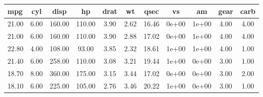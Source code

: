 \begin{tabular}{lcccccccccc}
\hline
\textbf{mpg} & \textbf{cyl} & \textbf{disp} & \textbf{hp} & \textbf{drat} & \textbf{wt} & \textbf{qsec} & \textbf{vs} & \textbf{am} & \textbf{gear} & \textbf{carb} \\
\hline
21.00 & 6.00 & 160.00 & 110.00 & 3.90 & 2.62 & 16.46 & 0e+00 & 1e+00 & 4.00 & 4.00\\
21.00 & 6.00 & 160.00 & 110.00 & 3.90 & 2.88 & 17.02 & 0e+00 & 1e+00 & 4.00 & 4.00\\
22.80 & 4.00 & 108.00 &  93.00 & 3.85 & 2.32 & 18.61 & 1e+00 & 1e+00 & 4.00 & 1.00\\
21.40 & 6.00 & 258.00 & 110.00 & 3.08 & 3.21 & 19.44 & 1e+00 & 0e+00 & 3.00 & 1.00\\
18.70 & 8.00 & 360.00 & 175.00 & 3.15 & 3.44 & 17.02 & 0e+00 & 0e+00 & 3.00 & 2.00\\
18.10 & 6.00 & 225.00 & 105.00 & 2.76 & 3.46 & 20.22 & 1e+00 & 0e+00 & 3.00 & 1.00\\
\hline
\end{tabular}
